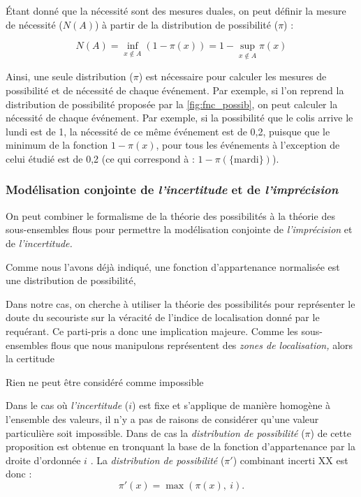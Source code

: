 Étant donné que la nécessité sont des mesures duales, on peut définir
la mesure de nécessité (\(N(A)\)) à partir de la distribution de
possibilité (\(π\)) :

\begin{equation}
  N(A) = \inf_{x ∉ A}(1-π(x)) = 1 - \sup_{x ∉ A}π(x)
\end{equation}

Ainsi, une seule distribution (\(\pi\)) est nécessaire pour calculer
les mesures de possibilité et de nécessité de chaque événement. Par
exemple, si l'on reprend la distribution de possibilité proposée par
la \autoref{fig:fnc_possib}, on peut calculer la nécessité de chaque
événement. Par exemple, si la possibilité que le colis arrive le lundi
est de 1, la nécessité de ce même événement est de 0,2, puisque que le
minimum de la fonction \(1-π(x)\), pour tous les événements à
l'exception de celui étudié est de 0,2 (ce qui correspond à :
\(1-π(\{\text{mardi}\})\)).

\subsubsection{Modélisation conjointe de \emph{l'incertitude} et de
  \emph{l'imprécision}}

On peut combiner le formalisme de la théorie des possibilités à la
théorie des sous-ensembles flous pour permettre la modélisation
conjointe de \emph{l'imprécision} et de \emph{l'incertitude.}



Comme nous l'avons déjà indiqué, une fonction d'appartenance
normalisée est une distribution de possibilité,

Dans notre cas, on cherche à utiliser la théorie des possibilités pour
représenter le doute du secouriste sur la véracité de l'indice de
localisation donné par le requérant. Ce parti-pris a donc une
implication majeure. Comme les sous-ensembles flous que nous
manipulons représentent des \emph{zones de localisation,} alors la
certitude

Rien ne peut être considéré comme impossible


Dans le cas où \emph{l'incertitude} (\(i\)) est fixe et s'applique de
manière homogène à l'ensemble des valeurs, il n'y a pas de raisons de
considérer qu'une valeur particulière soit impossible. Dans de cas la
\emph{distribution de possibilité} (\(π\)) de cette proposition est
obtenue en tronquant la base de la fonction d'appartenance par la
droite d'ordonnée \(i\) \autocite{Bouchon-Meunier2007}. La
\emph{distribution de possibilité} (\(π'\)) combinant incerti XX est
donc :
%
\begin{equation}
  π'(x) = \max(π(x),\ i).  
\end{equation}




